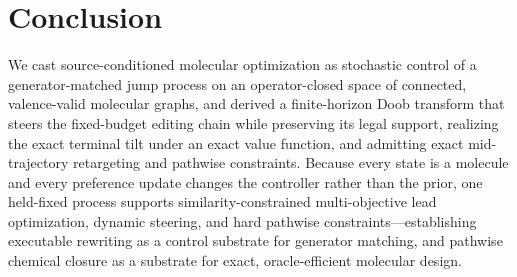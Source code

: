 \section{Conclusion}
\label{sec:conclusion}

We cast source-conditioned molecular optimization as stochastic control of a generator-matched jump
process on an operator-closed space of connected, valence-valid molecular graphs, and derived a
finite-horizon Doob transform that steers the fixed-budget editing chain while preserving its legal
support, realizing the exact terminal tilt under an exact value function, and admitting exact
mid-trajectory retargeting and pathwise constraints. Because every state is a molecule and every
preference update changes the controller rather than the prior, one held-fixed process supports
similarity-constrained multi-objective lead optimization, dynamic steering, and hard pathwise
constraints---establishing executable rewriting as a control substrate for generator matching, and
pathwise chemical closure as a substrate for exact, oracle-efficient molecular design.
